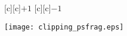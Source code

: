 \documentclass{article}
\begin{document}
\begin{figure}[htb]
  \begin{center}



        [c][c]{\footnotesize$+1$}
        [c][c]{\footnotesize$-1$}




    \texttt{[image: clipping\_psfrag.eps]}
    \end{center}
\end{figure}
\end{document}
